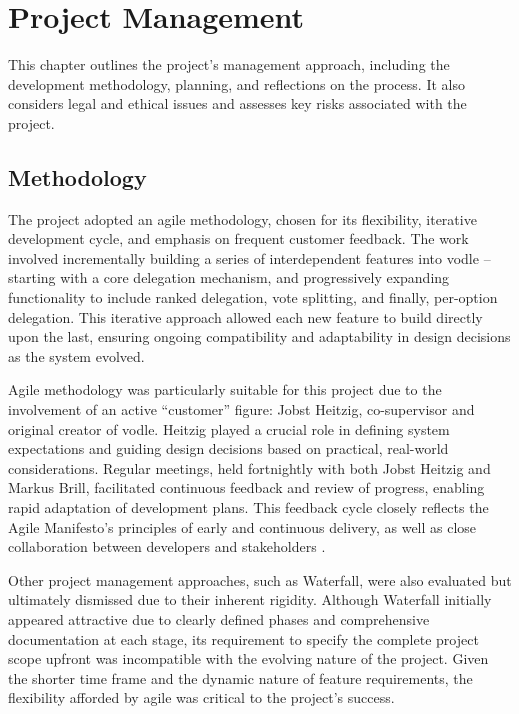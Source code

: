 \chapter{Project Management}\label{ch:project_management}

This chapter outlines the project's management approach, including the development methodology, planning, and reflections on the process. It also considers legal and ethical issues and assesses key risks associated with the project.

\section{Methodology}
The project adopted an agile methodology, chosen for its flexibility, iterative development cycle, and emphasis on frequent customer feedback. The work involved incrementally building a series of interdependent features into vodle -- starting with a core delegation mechanism, and progressively expanding functionality to include ranked delegation, vote splitting, and finally, per-option delegation. This iterative approach allowed each new feature to build directly upon the last, ensuring ongoing compatibility and adaptability in design decisions as the system evolved.

Agile methodology was particularly suitable for this project due to the involvement of an active ``customer'' figure: Jobst Heitzig, co-supervisor and original creator of vodle. Heitzig played a crucial role in defining system expectations and guiding design decisions based on practical, real-world considerations. Regular meetings, held fortnightly with both Jobst Heitzig and Markus Brill, facilitated continuous feedback and review of progress, enabling rapid adaptation of development plans. This feedback cycle closely reflects the Agile Manifesto's principles of early and continuous delivery, as well as close collaboration between developers and stakeholders \citep{agilemanifesto2001}.

Other project management approaches, such as Waterfall, were also evaluated but ultimately dismissed due to their inherent rigidity. Although Waterfall initially appeared attractive due to clearly defined phases and comprehensive documentation at each stage, its requirement to specify the complete project scope upfront was incompatible with the evolving nature of the project. Given the shorter time frame and the dynamic nature of feature requirements, the flexibility afforded by agile was critical to the project's success.

